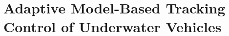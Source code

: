 \section{ Adaptive Model-Based Tracking Control of Underwater Vehicles}
\label{chUV_AMBC.sec.theory}






